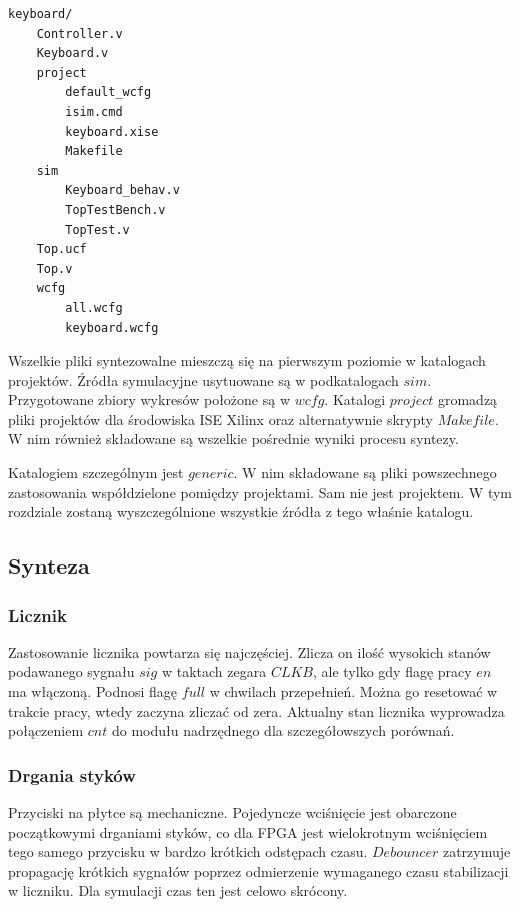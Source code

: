 \documentclass[a4paper,12pt]{article}
\begin{document}
\begin{verbatim}
keyboard/
    Controller.v
    Keyboard.v
    project
        default_wcfg
        isim.cmd
        keyboard.xise
        Makefile
    sim
        Keyboard_behav.v
        TopTestBench.v
        TopTest.v
    Top.ucf
    Top.v
    wcfg
        all.wcfg
        keyboard.wcfg
\end{verbatim}

Wszelkie pliki syntezowalne mieszczą się na pierwszym poziomie w katalogach projektów. Źródła symulacyjne usytuowane są w podkatalogach $sim$. Przygotowane zbiory wykresów położone są w $wcfg$. Katalogi $project$ gromadzą pliki projektów dla środowiska ISE Xilinx oraz alternatywnie skrypty $Makefile$. W nim również składowane są wszelkie pośrednie wyniki procesu syntezy.

Katalogiem szczególnym jest $generic$. W nim składowane są pliki powszechnego zastosowania współdzielone pomiędzy projektami. Sam nie jest projektem. W tym rozdziale zostaną wyszczególnione wszystkie źródła z tego właśnie katalogu.

\subsection{Synteza}

\subsubsection{Licznik}
Zastosowanie licznika powtarza się najczęściej. Zlicza on ilość wysokich stanów podawanego sygnału $sig$ w taktach zegara $CLKB$, ale tylko gdy flagę pracy $en$ ma włączoną. Podnosi flagę $full$ w chwilach przepełnień. Można go resetować w trakcie pracy, wtedy zaczyna zliczać od zera. Aktualny stan licznika wyprowadza połączeniem $cnt$ do modułu nadrzędnego dla szczegółowszych porównań.


\subsubsection{Drgania styków}
Przyciski na płytce są mechaniczne. Pojedyncze wciśnięcie jest obarczone początkowymi drganiami styków, co dla FPGA jest wielokrotnym wciśnięciem tego samego przycisku w bardzo krótkich odstępach czasu. $Debouncer$ zatrzymuje propagację krótkich sygnałów poprzez odmierzenie wymaganego czasu stabilizacji w liczniku. Dla symulacji czas ten jest celowo skrócony.

\end{document}
